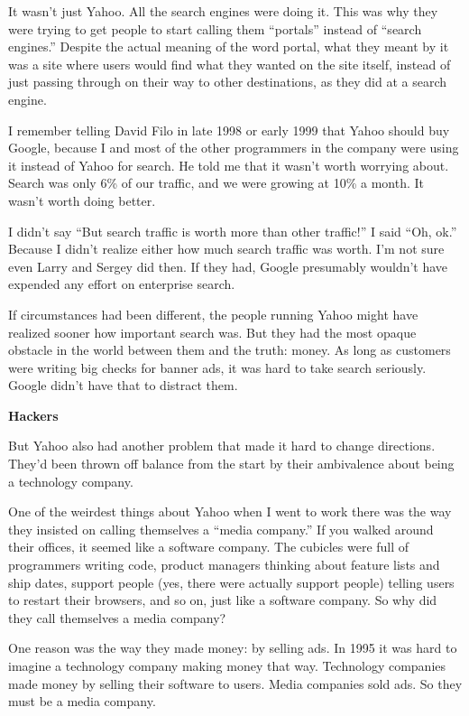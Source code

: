 \documentclass[12pt]{book}
\begin{document}
It wasn't just Yahoo. All the search engines were doing it. This was why
they were trying to get people to start calling them ``portals'' instead
of ``search engines.'' Despite the actual meaning of the word portal,
what they meant by it was a site where users would find what they wanted
on the site itself, instead of just passing through on their way to
other destinations, as they did at a search engine.

I remember telling David Filo in late 1998 or early 1999 that Yahoo
should buy Google, because I and most of the other programmers in the
company were using it instead of Yahoo for search. He told me that it
wasn't worth worrying about. Search was only 6\% of our traffic, and we
were growing at 10\% a month. It wasn't worth doing better.

I didn't say ``But search traffic is worth more than other traffic!'' I
said ``Oh, ok.'' Because I didn't realize either how much search traffic
was worth. I'm not sure even Larry and Sergey did then. If they had,
Google presumably wouldn't have expended any effort on enterprise
search.

If circumstances had been different, the people running Yahoo might have
realized sooner how important search was. But they had the most opaque
obstacle in the world between them and the truth: money. As long as
customers were writing big checks for banner ads, it was hard to take
search seriously. Google didn't have that to distract them.

\textbf{Hackers}

But Yahoo also had another problem that made it hard to change
directions. They'd been thrown off balance from the start by their
ambivalence about being a technology company.

One of the weirdest things about Yahoo when I went to work there was the
way they insisted on calling themselves a ``media company.'' If you
walked around their offices, it seemed like a software company. The
cubicles were full of programmers writing code, product managers
thinking about feature lists and ship dates, support people (yes, there
were actually support people) telling users to restart their browsers,
and so on, just like a software company. So why did they call themselves
a media company?

One reason was the way they made money: by selling ads. In 1995 it was
hard to imagine a technology company making money that way. Technology
companies made money by selling their software to users. Media companies
sold ads. So they must be a media company.
\end{document}
